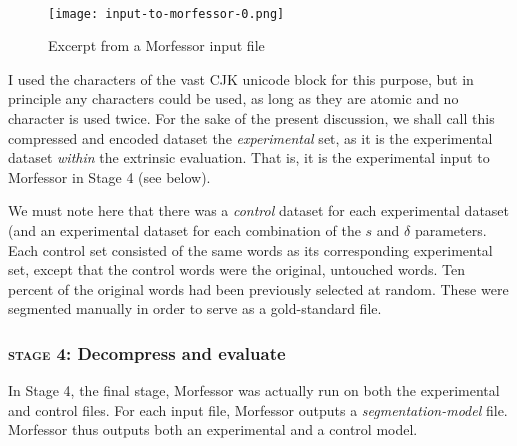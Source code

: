 \begin{figure}[t]
\centering
{} \\
[\baselineskip]
\end{figure}

\begin{figure}[h]
\texttt{[image: input-to-morfessor-0.png]}
\label{fig:morfessor-input}
\caption{Excerpt from a Morfessor input file}
\end{figure}

I used the characters of the vast CJK unicode block for this purpose, 
but in principle any characters could be used, as long as they are atomic and 
no character is used twice. For the sake of the present discussion, we shall 
call this compressed and encoded dataset the \emph{experimental} set, as it is 
the experimental dataset \emph{within} the extrinsic evaluation. That is, it is 
the experimental input to Morfessor in Stage 4 (see below). 

We must note here that there was a \emph{control} dataset for each experimental 
dataset (and an experimental dataset for each combination of the $s$ and $\delta$ 
parameters. Each control set consisted of the same words as its corresponding experimental 
set, except that the control words were the original, untouched words. Ten percent of the 
original words had been previously selected at random. These were segmented manually in 
order to serve as a gold-standard file. 

 
\subsubsection{\textsc{stage 4:} Decompress and evaluate}
 In Stage 4, the final stage, Morfessor was actually run on both the experimental and control files. 
 For each input file, Morfessor outputs a \textit{segmentation-model} file.
 Morfessor thus outputs both an experimental and a control model. 
 
